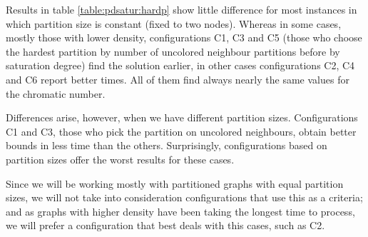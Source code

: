 \begin{itemize}
\end{itemize}

Results in table \ref{table:pdsatur:hardp} show little difference for most instances in which partition size is constant (fixed to two nodes). Whereas in some cases, mostly those with lower density, configurations C1, C3 and C5 (those who choose the hardest partition by number of uncolored neighbour partitions before by saturation degree) find the solution earlier, in other cases configurations C2, C4 and C6 report better times. All of them find always nearly the same values for the chromatic number.

Differences arise, however, when we have different partition sizes. Configurations C1 and C3, those who pick the partition on uncolored neighbours, obtain better bounds in less time than the others. Surprisingly, configurations based on partition sizes offer the worst results for these cases.

Since we will be working mostly with partitioned graphs with equal partition sizes, we will not take into consideration configurations that use this as a criteria; and as graphs with higher density have been taking the longest time to process, we will prefer a configuration that best deals with this cases, such as C2.

